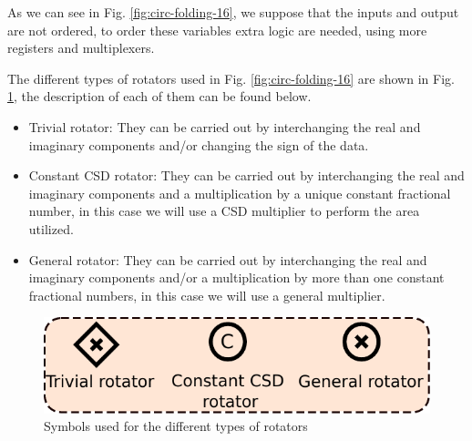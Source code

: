 \documentclass[journal,comsoc]{IEEEtran}
\begin{document}
As we can see in Fig. \ref{fig:circ-folding-16}, we suppose that the inputs and output are not ordered, to order these variables extra logic are needed, using more registers and multiplexers.

The different types of rotators used in Fig. \ref{fig:circ-folding-16} are shown in Fig. \ref{fig:rotators}, the description of each of them can be found below.
\begin{itemize}
	\item Trivial rotator: They can be carried out by interchanging the real and imaginary components and/or changing the sign of the data.
	\item Constant CSD rotator: They can be carried out by interchanging the real and imaginary components and a multiplication by a unique constant fractional number, in this case we will use a CSD multiplier to perform the area utilized.
	\item General rotator: They can be carried out by interchanging the real and imaginary components and/or a multiplication by more than one constant fractional numbers, in this case we will use a general multiplier.
\end{itemize}
\begin{figure}[h!]
	\centering
	\includegraphics[width=0.6\linewidth]{Diagramas/miSeccionFiguras/Rotadores}%
	\caption{Symbols used for the different types of rotators}
	\label{fig:rotators}
\end{figure}



\end{document}
